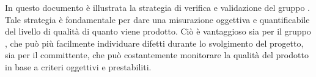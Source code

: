 In questo documento è illustrata la strategia di verifica e validazione del gruppo \gruppo . Tale strategia è fondamentale per dare una misurazione oggettiva e quantificabile del livello di qualità di quanto viene prodotto. \newline
Ciò è vantaggioso sia per il gruppo \gruppo , che può più facilmente individuare difetti durante lo svolgimento del progetto, sia per il {committente}, che può costantemente monitorare la qualità del prodotto in base a criteri oggettivi e prestabiliti.

